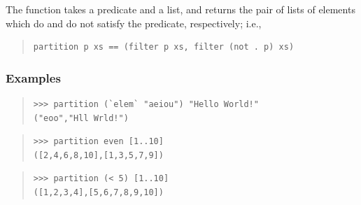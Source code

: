 \begin{haddockdesc}
\item[\begin{tabular}{@{}l}
partition :: (a -> Bool) -> {\char 91}a{\char 93} -> ({\char 91}a{\char 93}, {\char 91}a{\char 93})
\end{tabular}]
{\haddockbegindoc
The  function takes a predicate and a list, and returns
 the pair of lists of elements which do and do not satisfy the
 predicate, respectively; i.e.,\par
\begin{quote}
{\haddockverb\begin{verbatim}
partition p xs == (filter p xs, filter (not . p) xs)\end{verbatim}}
\end{quote}
\subsubsection*{\textbf{Examples}}
\begin{quote}
{\haddockverb\begin{verbatim}
>>> partition (`elem` "aeiou") "Hello World!"
("eoo","Hll Wrld!")

\end{verbatim}}
\end{quote}
\begin{quote}
{\haddockverb\begin{verbatim}
>>> partition even [1..10]
([2,4,6,8,10],[1,3,5,7,9])

\end{verbatim}}
\end{quote}
\begin{quote}
{\haddockverb\begin{verbatim}
>>> partition (< 5) [1..10]
([1,2,3,4],[5,6,7,8,9,10])

\end{verbatim}}
\end{quote}}
\end{haddockdesc}
